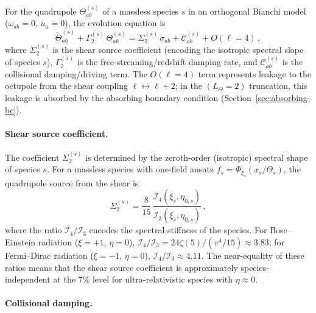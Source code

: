 For the quadrupole $\Theta^{(s)}_{ab}$ of a massless
species $s$ in an orthogonal Bianchi model
($\omega_{ab} = 0$, $\dot{u}_a = 0$), the evolution
equation is
\begin{equation}\label{eq:Q-species}
\dot{\Theta}^{(s)}_{ab}
+ \Gamma^{(s)}_2\, \Theta^{(s)}_{ab}
= \Sigma^{(s)}_2\, \sigma_{ab}
+ \mathcal{C}^{(s)}_{ab}
+ O(\ell = 4)\,,
\end{equation}
where
$\Sigma^{(s)}_2$ is the shear source coefficient
(encoding the isotropic spectral slope of species $s$),
$\Gamma^{(s)}_2$ is the free-streaming/redshift
damping rate, and
$\mathcal{C}^{(s)}_{ab}$ is the collisional
damping/driving term.  The $O(\ell = 4)$ term
represents leakage to the octupole from the shear
coupling $\ell \leftrightarrow \ell + 2$; in the
$(L_\Theta = 2)$ truncation, this leakage is absorbed
by the absorbing boundary condition
(Section~\ref{sec:absorbing-bc}).


\paragraph{Shear source coefficient.}

The coefficient $\Sigma^{(s)}_2$ is determined by the
zeroth-order (isotropic) spectral shape of species $s$.
For a massless species with one-field ansatz
$f_s = \Phi_{\xi_s}(x_s/\Theta_s)$, the quadrupole
source from the shear is
\begin{equation}\label{eq:shear-source}
\Sigma^{(s)}_2
= \frac{8}{15}\,
  \frac{\mathcal{I}_4(\xi_s, \eta_{0,s})}
       {\mathcal{I}_3(\xi_s, \eta_{0,s})}\,,
\end{equation}
where the ratio $\mathcal{I}_4/\mathcal{I}_3$ encodes
the spectral stiffness of the species.  For
Bose--Einstein radiation ($\xi = +1$, $\eta = 0$),
$\mathcal{I}_4/\mathcal{I}_3
= 24\zeta(5)/(\pi^4/15) \approx 3.83$;
for Fermi--Dirac radiation ($\xi = -1$, $\eta = 0$),
$\mathcal{I}_4/\mathcal{I}_3 \approx 4.11$.
The near-equality of
these ratios means that the shear source coefficient is
approximately species-independent at the $7\%$ level for
ultra-relativistic species with $\eta \approx 0$.


\paragraph{Collisional damping.}

